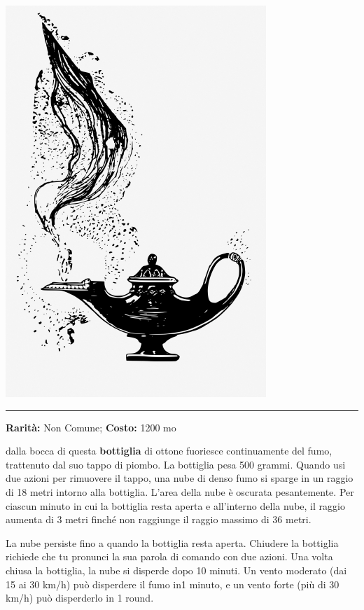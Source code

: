 \begin{multicols}{2}
\begin{center}
	\includegraphics[width=0.7\linewidth]{immagini/genielamp.png}
\end{center}

\smallskip\noindent\rule{\linewidth}{2pt}  \hypertarget{BottigliaFumante}{}\medskip{}\noindent\label{BottigliaFumante}

\textbf{Rarità:} Non Comune; \textbf{Costo:} 1200 mo

dalla bocca di questa \textbf{bottiglia} di ottone fuoriesce continuamente del fumo, trattenuto dal suo tappo di piombo. La bottiglia pesa 500 grammi. Quando usi due azioni per rimuovere il tappo, una nube di denso fumo si sparge in un raggio di 18 metri intorno alla bottiglia. L'area della nube è oscurata pesantemente. Per ciascun minuto in cui la bottiglia resta aperta e all'interno della nube, il raggio aumenta di 3 metri finché non raggiunge il raggio massimo di 36 metri.

La nube persiste fino a quando la bottiglia resta aperta. Chiudere la bottiglia richiede che tu pronunci la sua parola di comando con due azioni. Una volta chiusa la bottiglia, la nube si disperde dopo 10 minuti. Un vento moderato (dai 15 ai 30 km/h) può disperdere il fumo in1 minuto, e un vento forte (più di 30 km/h) può disperderlo in 1 round.


\end{multicols}
